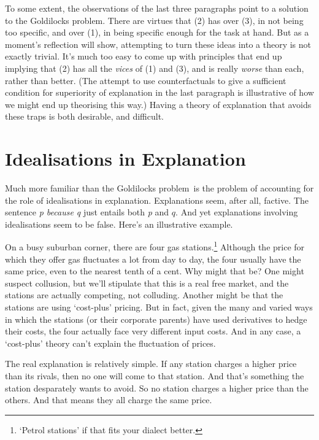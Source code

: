 \documentclass[
  11pt,
  letterpaper,
  DIV=11,
  numbers=noendperiod,
  twoside]{scrartcl}
\begin{document}
To some extent, the observations of the last three paragraphs point to a
solution to the Goldilocks problem. There are virtues that (2) has over
(3), in not being too specific, and over (1), in being specific enough
for the task at hand. But as a moment's reflection will show, attempting
to turn these ideas into a theory is not exactly trivial. It's much too
easy to come up with principles that end up implying that (2) has all
the \emph{vices} of (1) and (3), and is really \emph{worse} than each,
rather than better. (The attempt to use counterfactuals to give a
sufficient condition for superiority of explanation in the last
paragraph is illustrative of how we might end up theorising this way.)
Having a theory of explanation that avoids these traps is both
desirable, and difficult.

\section{Idealisations in
Explanation}\label{idealisations-in-explanation}

Much more familiar than the Goldilocks problem~is the problem of
accounting for the role of idealisations in explanation. Explanations
seem, after all, factive. The sentence \emph{p because q} just entails
both \emph{p} and \(q\). And yet explanations involving idealisations
seem to be false. Here's an illustrative example.

On a busy suburban corner, there are four gas stations.\footnote{`Petrol
  stations' if that fits your dialect better.} Although the price for
which they offer gas fluctuates a lot from day to day, the four usually
have the same price, even to the nearest tenth of a cent. Why might that
be? One might suspect collusion, but we'll stipulate that this is a real
free market, and the stations are actually competing, not colluding.
Another might be that the stations are using `cost-plus' pricing. But in
fact, given the many and varied ways in which the stations (or their
corporate parents) have used derivatives to hedge their costs, the four
actually face very different input costs. And in any case, a `cost-plus'
theory can't explain the fluctuation of prices.

The real explanation is relatively simple. If any station charges a
higher price than its rivals, then no one will come to that station. And
that's something the station desparately wants to avoid. So no station
charges a higher price than the others. And that means they all charge
the same price.
\end{document}
